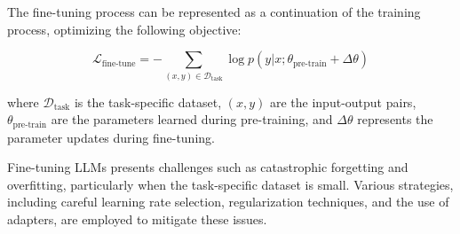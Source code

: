             The fine-tuning process can be represented as a continuation of the training process, optimizing the following objective:
            
            \begin{equation}
            \mathcal{L}_{\text{fine-tune}} = -\sum_{(x,y) \in \mathcal{D}_{\text{task}}} \log p(y | x; \theta_{\text{pre-train}} + \Delta\theta)
            \end{equation}
            
            where $\mathcal{D}_{\text{task}}$ is the task-specific dataset, $(x,y)$ are the input-output pairs, $\theta_{\text{pre-train}}$ are the parameters learned during pre-training, and $\Delta\theta$ represents the parameter updates during fine-tuning.
            \vspace*{0.2cm}

            Fine-tuning LLMs presents challenges such as catastrophic forgetting and overfitting, particularly when the task-specific dataset is small. Various strategies, including careful learning rate selection, regularization techniques, and the use of adapters, are employed to mitigate these issues.